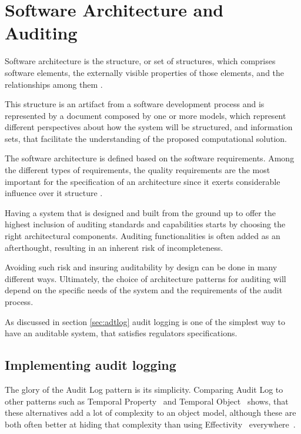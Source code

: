 %
\chapter{Software Architecture and Auditing}\label{chap:sadt}

Software architecture is the structure, or set of structures, which comprises software elements, the externally visible properties of those elements, and the relationships among them \citep{SAIP}. 

This structure is an artifact from a software development process and is represented by a document composed by one or more models, which represent different perspectives about how the system will be structured, and information sets, that facilitate the understanding of the proposed computational solution. 

The software architecture is defined based on the software requirements. Among the different types of requirements, the quality requirements are the most important for the specification of an architecture since it exerts considerable influence over it structure \citep{SAIP}.

Having a system that is designed and built from the ground up to offer the highest inclusion of auditing standards and capabilities starts by choosing the right architectural components. Auditing functionalities is often added as an afterthought, resulting in an inherent risk of incompleteness. 

Avoiding such risk and insuring auditability by design can be done in many different ways. Ultimately, the choice of architecture patterns for auditing will depend on the specific needs of the system and the requirements of the audit process.

As discussed in section \ref{sec:adtlog} audit logging is one of the simplest way to have an auditable system, that satisfies regulators specifications.

\pagebreak

\section{Implementing audit logging}\label{sec:adtimpl}

The glory of the Audit Log pattern is its simplicity. Comparing Audit Log to other patterns such as Temporal Property~\citep{TemporalProperty} and Temporal Object~\citep{TemporalObject} shows, that these alternatives add a lot of complexity to an object model, although these are both often better at hiding that complexity than using Effectivity~\citep{Effectiv17} everywhere~\citep{AuditLog}.

